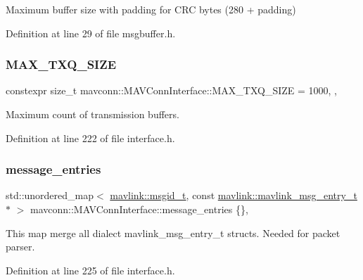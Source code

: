 Maximum buffer size with padding for C\+RC bytes (280 + padding) 



Definition at line 29 of file msgbuffer.\+h.

\mbox{\label{group__mavconn_gaf5e70afd06413dba8c7aee46396f03a1}} 
\subsubsection{\texorpdfstring{MAX\_TXQ\_SIZE}{MAX\_TXQ\_SIZE}}
{\footnotesize\ttfamily constexpr size\+\_\+t mavconn\+::\+M\+A\+V\+Conn\+Interface\+::\+M\+A\+X\+\_\+\+T\+X\+Q\+\_\+\+S\+I\+ZE = 1000\hspace{0.3cm}{\ttfamily [static]}, {\ttfamily [constexpr]}, {\ttfamily [protected]}}



Maximum count of transmission buffers. 



Definition at line 222 of file interface.\+h.

\mbox{\label{group__mavconn_ga95f9336a3630ce53abf1611f5e8a061f}} 
\subsubsection{\texorpdfstring{message\_entries}{message\_entries}}
{\footnotesize\ttfamily std\+::unordered\+\_\+map$<$ \mbox{\hyperlink{namespacemavlink_a98a1fe49b380ed1ea252d2c13bf3278d}{mavlink\+::msgid\+\_\+t}}, const \mbox{\hyperlink{include__v2_80_2mavlink__types_8h_abf009bf897407a543e5209298ad82321}{mavlink\+::mavlink\+\_\+msg\+\_\+entry\+\_\+t}} $\ast$ $>$ mavconn\+::\+M\+A\+V\+Conn\+Interface\+::message\+\_\+entries \{\}\hspace{0.3cm}{\ttfamily [static]}, {\ttfamily [protected]}}



This map merge all dialect mavlink\+\_\+msg\+\_\+entry\+\_\+t structs. Needed for packet parser. 



Definition at line 225 of file interface.\+h.

\mbox{\label{group__mavconn_ga47d4ac1fa3ceb8797164b56c517f1ff8}} 
